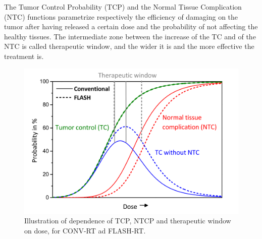         The Tumor Control Probability (TCP) and the Normal Tissue Complication (NTC) functions parametrize respectively the efficiency of damaging on the tumor after having released a certain dose and the probability of not affecting the healthy tissues. The intermediate zone between the increase of the TC and of the NTC is called therapeutic window, and the wider it is and the more effective the treatment is. 
        \begin{figure}
            \centering
            \includegraphics[width=.7\linewidth]{figures/pixel_detectors_usage/curve_flash.png}
            \caption{Illustration of dependence of TCP, NTCP and therapeutic window on dose, for CONV-RT ad FLASH-RT.}
            \label{fig:therapeutic_window}
        \end{figure}

